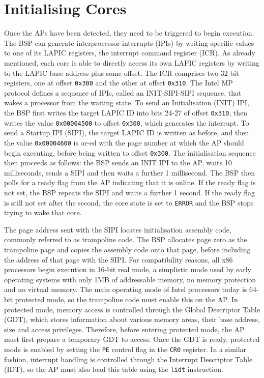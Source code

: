 \documentclass[bsc,frontabs,singlespacing,parskip,deptreport]{infthesis}     %
\begin{document}
\section{Initialising Cores} \label{initialising-cores}
Once the APs have been detected, they need to be triggered to begin execution. The BSP can generate interprocessor interrupts (IPIs) by writing specific values to one of its LAPIC registers, the interrupt command register (ICR). As already mentioned, each core is able to directly access its own LAPIC registers by writing to the LAPIC base address plus some offset. The ICR comprises two 32-bit registers, one at offset \verb|0x300| and the other at offset \verb|0x310|. The Intel MP protocol defines a sequence of IPIs, called an INIT-SIPI-SIPI sequence, that wakes a processor from the waiting state. To send an Initialisation (INIT) IPI, the BSP first writes the target LAPIC ID into bits 24-27 of offset \verb|0x310|, then writes the value \verb|0x00004500| to offset \verb|0x300|, which generates the interrupt. To send a Startup IPI (SIPI), the target LAPIC ID is written as before, and then the value \verb|0x00004600| is or-ed with the page number at which the AP should begin executing, before being written to offset \verb|0x300|. The initialisation sequence then proceeds as follows: the BSP sends an INIT IPI to the AP, waits 10 milliseconds, sends a SIPI and then waits a further 1 millisecond. The BSP then polls for a ready flag from the AP indicating that it is online. If the ready flag is not set, the BSP repeats the SIPI and waits a further 1 second. If the ready flag is still not set after the second, the core state is set to \verb|ERROR| and the BSP stops trying to wake that core.

The page address sent with the SIPI locates initialisation assembly code, commonly referred to as trampoline code. The BSP allocates page zero as the trampoline page and copies the assembly code onto that page, before including the address of that page with the SIPI. For compatibility reasons, all x86 processors begin execution in 16-bit real mode, a simplistic mode used by early operating systems with only 1MB of addressable memory, no memory protection and no virtual memory. The main operating mode of Intel processors today is 64-bit protected mode, so the trampoline code must enable this on the AP. In protected mode, memory access is controlled through the Global Descriptor Table (GDT), which stores information about various memory areas, their base address, size and access privileges. Therefore, before entering protected mode, the AP must first prepare a temporary GDT to access. Once the GDT is ready, protected mode is enabled by setting the \verb|PE| control flag in the \verb|CR0| register. In a similar fashion, interrupt handling is controlled through the Interrupt Descriptor Table (IDT), so the AP must also load this table using the \verb|lidt| instruction.
\end{document}

